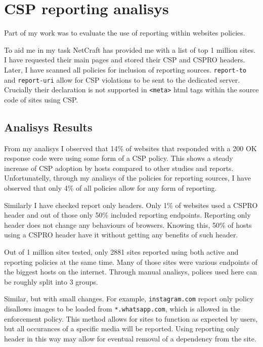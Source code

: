 \section{CSP reporting analisys}

Part of my work was to evaluate the use of reporting within websites policies.

To aid me in my task NetCraft has provided me with a list of top 1 million sites.
I have requested their main pages and stored their CSP and CSPRO headers.
Later, I have scanned all policies for inclusion of reporting sources.
\texttt{report-to} and \texttt{report-uri} allow for CSP violations to be sent to the dedicated server.
Crucially their declaration is not supported in \texttt{<meta>} html tags within the source code of sites using CSP.

\subsection{Analisys Results}

From my analisys I observed that 14\% of websites that responded with a 200 OK response code were using some form of a CSP policy.
This shows a steady increase of CSP adoption by hosts compared to other studies and reports.
Unfortunatelly, through my analisys of the policies for reporting sources, I have observed that only 4\% of all policies allow for any form of reporting.

Similarly I have checked report only headers. 
Only 1\% of websites used a CSPRO header and out of those only 50\% included reporting endpoints.
Reporting only header does not change any behaviours of browsers. 
Knowing this, 50\% of hosts using a CSPRO header have it without getting any benefits of such header.

Out of 1 million sites tested, only 2881 sites reported using both active and reporting policies at the same time.
Many of those sites were various endpoints of the biggest hosts on the internet.
Through manual analisys, polices used here can be roughly split into 3 groups.

Similar, but with small changes.
For example, \texttt{instagram.com} report only policy disallows images to be loaded from \texttt{*.whatsapp.com}, which is allowed in the enforcement policy.
This method allows for sites to function as expected by users, but all occurances of a specific media will be reported.
Using reporting only header in this way may allow for eventual removal of a dependency from the site.

